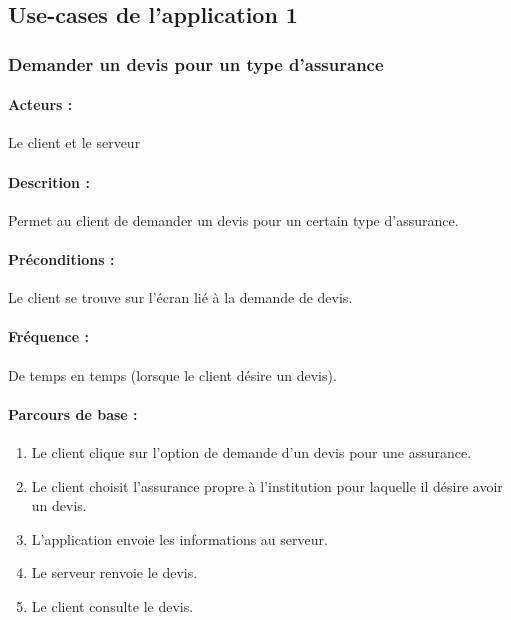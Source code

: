 \documentclass[../annexe.tex]{subfiles}
\begin{document}
\subsection{Use-cases de l'application 1}

\subsubsection{Demander un devis pour un type d'assurance}

\paragraph{Acteurs :} Le client et le serveur 


\paragraph{Descrition :} Permet au client de demander un devis pour un certain type d'assurance.


\paragraph{Préconditions :} Le client se trouve sur l'écran lié à la demande de devis.


\paragraph{Fréquence :} De temps en temps (lorsque le client désire un devis).



\paragraph{Parcours de base :}

	\begin{enumerate}
	
		\item Le client clique sur l'option de demande d'un devis pour une assurance.
		\item Le client choisit l'assurance propre à l'institution pour laquelle il désire avoir un devis.
		\item L'application envoie les informations au serveur.
		\item Le serveur renvoie le devis.
		\item Le client consulte le devis.
	\end{enumerate}
	
\end{document}
